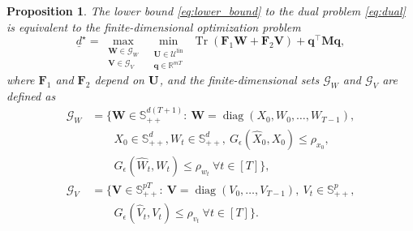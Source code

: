 \documentclass[letterpaper, 10 pt, conference]{ieeeconf}  %
\theoremstyle{ieeeconf}
\newtheorem{proposition}{Proposition}
\DeclareMathOperator{\Tr}{Tr}
\newcommand{\R}{\mathbb{R}}
\newcommand{\Symm}{\mathbb{S}}
\begin{document}
\begin{proposition}
\label{proposition:trace_rewriting}
The lower bound \eqref{eq:lower_bound} to the dual problem \eqref{eq:dual} is equivalent to the finite-dimensional optimization problem
\begin{equation}
\label{eq:trace_lowerbound}
    \underline{d}^\star = \max _{\substack{\mathbf{W}\in\mathcal{G}_W\\ \mathbf{V}\in\mathcal{G}_V}}\ \min _{\substack{\mathbf{U}\in\mathcal{U}^{\text{lin}}\\ \mathbf{q}\in\R^{mT}}}\ \Tr\left(\mathbf{F}_{1} \mathbf{W}+\mathbf{F}_{2} \mathbf{V}\right)+\mathbf{q}^{\top} \mathbf{M} \mathbf{q},
    \end{equation}
    where $\mathbf{F}_1$ and $\mathbf{F}_2$ depend on $\bf U$, and the finite-dimensional sets $\mathcal{G}_W$ and $\mathcal{G}_V$ are defined as
    \begin{align}
        \mathcal{G}_{W} &= \big\{ \mathbf{W} \in \Symm_{++}^{d(T+1)} :\ 
        \mathbf{W} = \operatorname{diag}(X_0, W_0, \ldots, W_{T{-}1}),\nonumber 
        \\
        &\quad\quad X_0 \in \mathbb{S}_{++}^d,  W_t \in \Symm_{++}^d,\
        G_\epsilon(\hat{X}_0, X_0) \leq \rho_{x_0},\nonumber \\
        &\quad\quad G_\epsilon(\hat{W}_t, W_t) \leq \rho_{w_t} \ \forall t \in [T] \big\},\label{eq:GW} \\
        \mathcal{G}_{V} &= \big\{ \mathbf{V} \in \Symm_{++}^{pT} :\ 
        \mathbf{V} = \operatorname{diag}(V_0, \ldots, V_{T{-}1}),\
        V_t \in \mathbb{S}_{++}^p\nonumber, \\
        &\quad\quad G_\epsilon(\hat{V}_t, V_t) \leq \rho_{v_t} \ \forall t \in [T] \big\}.\label{eq:GV}
    \end{align}
\end{proposition}
\end{document}
